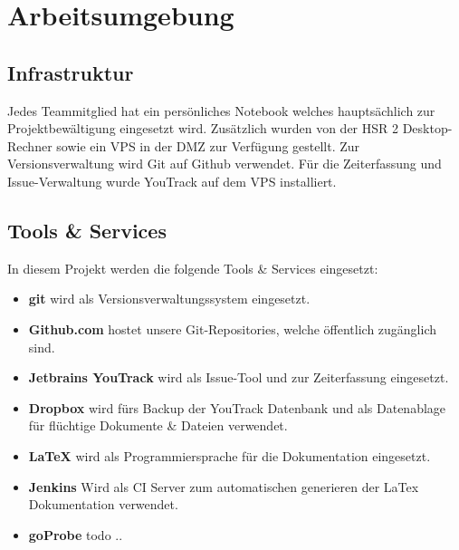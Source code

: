 \section{Arbeitsumgebung}
\label{sec:Arbeitsumgebung}

\subsection{Infrastruktur}
Jedes Teammitglied hat ein persönliches Notebook welches hauptsächlich zur Projektbewältigung eingesetzt wird. Zusätzlich wurden von der \acs{HSR} 2 Desktop-Rechner sowie ein \acs{VPS} in der DMZ zur Verfügung gestellt.
Zur Versionsverwaltung wird Git auf Github verwendet. Für die Zeiterfassung und Issue-Verwaltung wurde YouTrack auf dem \acs{VPS} installiert.

\subsection{Tools \& Services}
In diesem Projekt werden die folgende Tools \& Services eingesetzt:

\begin{itemize}
  \item \textbf{git} \newline wird als Versionsverwaltungssystem eingesetzt.
  \item \textbf{Github.com} \newline hostet unsere Git-Repositories, welche öffentlich zugänglich sind.
  \item \textbf{Jetbrains YouTrack} \newline wird als Issue-Tool und zur Zeiterfassung eingesetzt. 
  \item \textbf{Dropbox} \newline wird fürs Backup der YouTrack Datenbank und als Datenablage für flüchtige Dokumente \& Dateien verwendet.
  \item \textbf{\LaTeX} \newline wird als Programmiersprache für die Dokumentation eingesetzt.
  \item \textbf{Jenkins} \newline Wird als \acl{CI} Server zum automatischen generieren der LaTex Dokumentation verwendet.
  \item \textbf{goProbe} \newline todo ..
\end{itemize}
